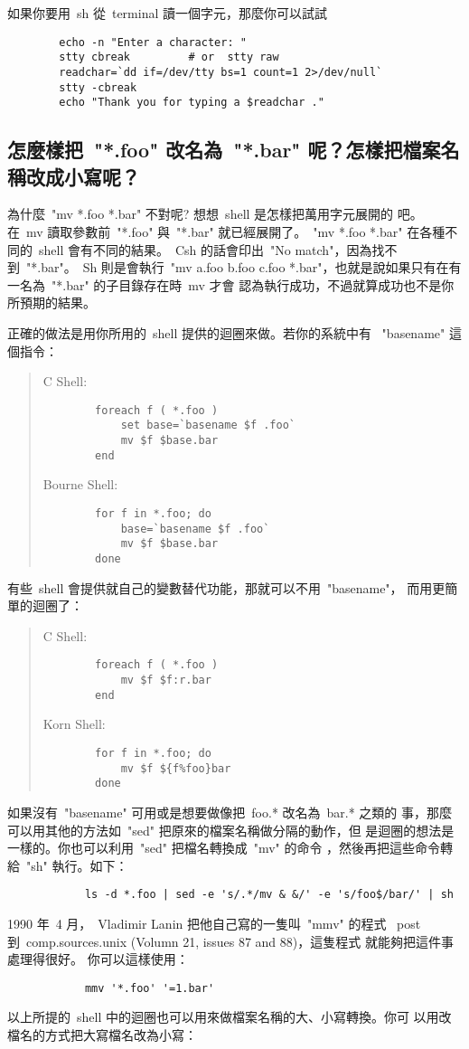 \documentclass{article}
\begin{document}
\begin{CJK*}{Bg5}{ming}
	如果你要用~sh 從~terminal 讀一個字元，那麼你可以試試
\begin{verbatim}
		echo -n "Enter a character: "
		stty cbreak         # or  stty raw
		readchar=`dd if=/dev/tty bs=1 count=1 2>/dev/null`
		stty -cbreak
		echo "Thank you for typing a $readchar ."
\end{verbatim}

\subsection{怎麼樣把~"*.foo" 改名為~"*.bar" 呢？怎樣把檔案名稱改成小寫呢？}

	為什麼~"mv *.foo *.bar" 不對呢? 想想~shell 是怎樣把萬用字元展開的
	吧。 在~mv 讀取參數前~"*.foo" 與~"*.bar" 就已經展開了。~"mv *.foo 
	*.bar" 在各種不同的~shell 會有不同的結果。~Csh 的話會印出~"No 
	match"，因為找不到~"*.bar"。~Sh 則是會執行~"mv a.foo b.foo c.foo 
	*.bar"，也就是說如果只有在有一名為~"*.bar" 的子目錄存在時~mv 才會
	認為執行成功，不過就算成功也不是你所預期的結果。

	正確的做法是用你所用的~shell 提供的迴圈來做。若你的系統中有 
	~"basename" 這個指令：
\begin{quote}
	C Shell:
\begin{verbatim}
		foreach f ( *.foo )
		    set base=`basename $f .foo`
		    mv $f $base.bar
		end
\end{verbatim}

	Bourne Shell:
\begin{verbatim}
		for f in *.foo; do
		    base=`basename $f .foo`
		    mv $f $base.bar
		done
\end{verbatim}
\end{quote}
	有些~shell 會提供就自己的變數替代功能，那就可以不用~"basename"，
	而用更簡單的迴圈了：
\begin{quote}
	C Shell:
\begin{verbatim}
		foreach f ( *.foo )
		    mv $f $f:r.bar
		end
\end{verbatim}

	Korn Shell:
\begin{verbatim}
		for f in *.foo; do
		    mv $f ${f%foo}bar
		done
\end{verbatim}
\end{quote}
	如果沒有~"basename" 可用或是想要做像把~foo.* 改名為~bar.* 之類的
	事，那麼可以用其他的方法如~"sed" 把原來的檔案名稱做分隔的動作，但
	是迴圈的想法是一樣的。你也可以利用~"sed" 把檔名轉換成~"mv" 的命令
	，然後再把這些命令轉給~"sh" 執行。如下：
\begin{verbatim}
	        ls -d *.foo | sed -e 's/.*/mv & &/' -e 's/foo$/bar/' | sh
\end{verbatim}
	1990 年~4 月，~Vladimir Lanin 把他自己寫的一隻叫~"mmv" 的程式
	~post 到~comp.sources.unix (Volumn 21, issues 87 and 88)，這隻程式
	就能夠把這件事處理得很好。 你可以這樣使用：
\begin{verbatim}
        	mmv '*.foo' '=1.bar'
\end{verbatim}
	以上所提的~shell 中的迴圈也可以用來做檔案名稱的大、小寫轉換。你可
	以用改檔名的方式把大寫檔名改為小寫：


\end{CJK*}
\end{document}
